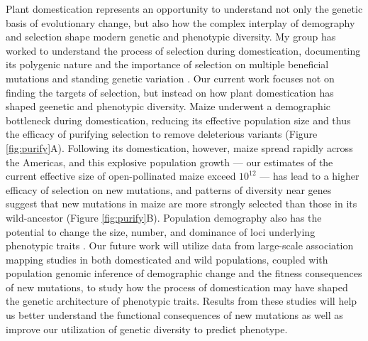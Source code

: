 \documentclass[11pt,letterpaper]{article}
\begin{document}
Plant domestication represents an opportunity to understand not only the genetic basis of evolutionary change, but also how the complex interplay of demography and selection shape modern genetic and phenotypic diversity.
My group has worked to understand the process of selection during domestication, documenting its polygenic nature \citep{hufford2012comparative} and the importance of selection on multiple beneficial mutations \citep{wills2013many} and standing genetic variation \citep{wills2013many, studer2011identification}. 
Our current work focuses not on finding the targets of selection, but instead on how plant domestication has shaped geenetic and phenotypic diversity.
Maize underwent a demographic bottleneck during domestication, reducing its effective population size and thus the efficacy of purifying selection to remove deleterious variants (Figure \ref{fig:purify}A).
Following its domestication, however, maize spread rapidly across the Americas, and this explosive population growth --- our estimates of the current effective size of open-pollinated maize exceed $10^12$ --- has lead to a higher efficacy of selection on new mutations, and patterns of diversity near genes suggest that new mutations in maize are more strongly selected than those in its wild-ancestor (Figure \ref{fig:purify}B).
Population demography also has the potential to change the size, number, and dominance of loci underlying phenotypic traits \citep{lohmueller2014impact,gazave2013population}.
Our future work will utilize data from large-scale association mapping studies in both domesticated and wild populations, coupled with population genomic inference of demographic change and the fitness consequences of new mutations, to study how the process of domestication may have shaped the genetic architecture of phenotypic traits.
Results from these studies will help us better understand the functional consequences of new mutations as well as improve our utilization of genetic diversity to predict phenotype.
\end{document}
